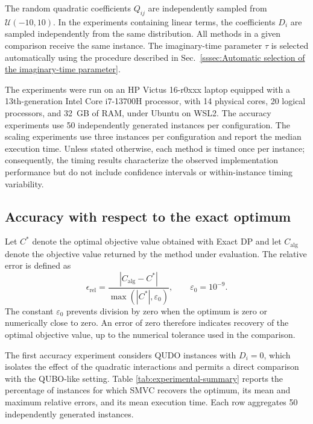 \documentclass[%
 reprint,
 amsmath,amssymb,
 aps,
 pra,showkeys,
]{revtex4-2}
\begin{document}
The random quadratic coefficients $Q_{ij}$ are independently sampled
from $\mathcal{U}(-10,10)$. In the experiments containing linear terms,
the coefficients $D_i$ are sampled independently from the same
distribution. All methods in a given comparison receive the same
instance. The imaginary-time parameter $\tau$ is selected automatically
using the procedure described in
Sec.~\ref{sssec:Automatic selection of the imaginary-time parameter}.

The experiments were run on an HP Victus 16-r0xxx laptop equipped with
a 13th-generation Intel Core i7-13700H processor, with 14 physical cores,
20 logical processors, and 32~GB of RAM, under Ubuntu on WSL2. The
accuracy experiments use 50 independently generated instances per
configuration. The scaling experiments use three instances per
configuration and report the median execution time. Unless stated
otherwise, each method is timed once per instance; consequently, the
timing results characterize the observed implementation performance but
do not include confidence intervals or within-instance timing
variability.

\subsection{Accuracy with respect to the exact optimum}
\label{ssec:accuracy-evaluation}

Let $C^*$ denote the optimal objective value obtained with Exact DP and
let $C_{\mathrm{alg}}$ denote the objective value returned by the method
under evaluation. The relative error is defined as
\begin{equation}
    \epsilon_{\mathrm{rel}}
    =
    \frac{\left|C_{\mathrm{alg}}-C^*\right|}
    {\max\left(\left|C^*\right|,\varepsilon_0\right)},
    \qquad
    \varepsilon_0=10^{-9}.
    \label{eq:relative-error}
\end{equation}
The constant $\varepsilon_0$ prevents division by zero when the optimum
is zero or numerically close to zero. An error of zero therefore
indicates recovery of the optimal objective value, up to the numerical
tolerance used in the comparison.

The first accuracy experiment considers QUDO instances with $D_i=0$,
which isolates the effect of the quadratic interactions and permits a
direct comparison with the QUBO-like setting. Table
\ref{tab:experimental-summary} reports the percentage of instances for
which SMVC recovers the optimum, its mean and maximum relative errors,
and its mean execution time. Each row aggregates 50 independently
generated instances.
\end{document}
